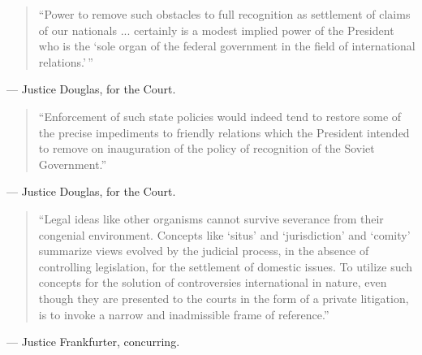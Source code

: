 \documentclass[12pt]{article}
\begin{document}
\begin{quote}
``Power to remove such obstacles to full recognition as settlement of claims of our nationals ... certainly is a modest implied power of the President who is the `sole organ of the federal government in the field of international relations.'\,''
\end{quote}
\noindent --- Justice Douglas, for the Court.

\begin{quote}
``Enforcement of such state policies would indeed tend to restore some of the precise impediments to friendly relations which the President intended to remove on inauguration of the policy of recognition of the Soviet Government.''
\end{quote}
\noindent --- Justice Douglas, for the Court.

\begin{quote}
``Legal ideas like other organisms cannot survive severance from their congenial environment. Concepts like `situs' and `jurisdiction' and `comity' summarize views evolved by the judicial process, in the absence of controlling legislation, for the settlement of domestic issues. To utilize such concepts for the solution of controversies international in nature, even though they are presented to the courts in the form of a private litigation, is to invoke a narrow and inadmissible frame of reference.''
\end{quote}
\noindent --- Justice Frankfurter, concurring.
\end{document}

